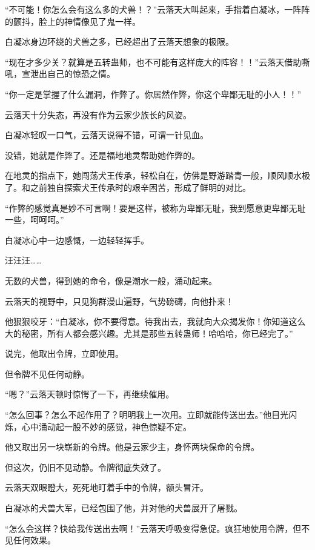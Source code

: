 
\begin{this_body}

“不可能！你怎么会有这么多的犬兽！？”云落天大叫起来，手指着白凝冰，一阵阵的颤抖，脸上的神情像见了鬼一样。

白凝冰身边环绕的犬兽之多，已经超出了云落天想象的极限。

“现在才多少关？就算是五转蛊师，也不可能有这样庞大的阵容！！”云落天借助嘶吼，宣泄出自己的惊恐之情。

“你一定是掌握了什么漏洞，作弊了。你居然作弊，你这个卑鄙无耻的小人！！”

云落天十分失态，再没有作为云家少族长的风姿。

白凝冰轻叹一口气，云落天说得不错，可谓一针见血。

没错，她就是作弊了。还是福地地灵帮助她作弊的。

在地灵的指点下，她闯荡犬王传承，轻松自在，仿佛是野游踏青一般，顺风顺水极了。和之前独自探索犬王传承时的艰辛困苦，形成了鲜明的对比。

“作弊的感觉真是妙不可言啊！要是这样，被称为卑鄙无耻，我到愿意更卑鄙无耻一些，呵呵呵。”

白凝冰心中一边感慨，一边轻轻挥手。

汪汪汪……

无数的犬兽，得到她的命令，像是潮水一般，涌动起来。

云落天的视野中，只见狗群漫山遍野，气势磅礴，向他扑来！

他狠狠咬牙：“白凝冰，你不要得意。待我出去，我就向大众揭发你！你知道这么大的秘密，所有人都会感兴趣。尤其是那些五转蛊师！哈哈哈，你已经完了。”

说完，他取出令牌，立即使用。

但令牌不见任何动静。

“嗯？”云落天顿时惊愕了一下，再继续催用。

“怎么回事？怎么不起作用了？明明我上一次用。立即就能传送出去。”他目光闪烁，心中涌动起一股不妙的感觉，神色惊疑不定。

他又取出另一块崭新的令牌。他是云家少主，身怀两块保命的令牌。

但这次，仍旧不见动静。令牌彻底失效了。

云落天双眼瞪大，死死地盯着手中的令牌，额头冒汗。

白凝冰的犬兽大军，已经包围了他，并对他的犬兽展开了屠戮。

“怎么会这样？快给我传送出去啊！”云落天呼吸变得急促。疯狂地使用令牌，但不见任何效果。


\end{this_body}
